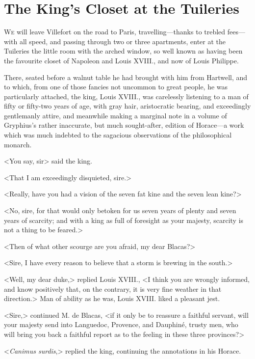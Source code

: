 \chapter{The King's Closet at the Tuileries} 

 \lettrine{W}{e} will leave Villefort on the road to Paris, travelling—thanks to trebled fees—with all speed, and passing through two or three apartments, enter at the Tuileries the little room with the arched window, so well known as having been the favourite closet of Napoleon and Louis XVIII., and now of Louis Philippe. 

 There, seated before a walnut table he had brought with him from Hartwell, and to which, from one of those fancies not uncommon to great people, he was particularly attached, the king, Louis XVIII., was carelessly listening to a man of fifty or fifty-two years of age, with gray hair, aristocratic bearing, and exceedingly gentlemanly attire, and meanwhile making a marginal note in a volume of Gryphius's rather inaccurate, but much sought-after, edition of Horace—a work which was much indebted to the sagacious observations of the philosophical monarch. 

 <You say, sir\longdash> said the king. 

 <That I am exceedingly disquieted, sire.> 

 <Really, have you had a vision of the seven fat kine and the seven lean kine?> 

 <No, sire, for that would only betoken for us seven years of plenty and seven years of scarcity; and with a king as full of foresight as your majesty, scarcity is not a thing to be feared.> 

 <Then of what other scourge are you afraid, my dear Blacas?> 

 <Sire, I have every reason to believe that a storm is brewing in the south.> 

 <Well, my dear duke,> replied Louis XVIII., <I think you are wrongly informed, and know positively that, on the contrary, it is very fine weather in that direction.> Man of ability as he was, Louis XVIII. liked a pleasant jest. 

 <Sire,> continued M. de Blacas, <if it only be to reassure a faithful servant, will your majesty send into Languedoc, Provence, and Dauphiné, trusty men, who will bring you back a faithful report as to the feeling in these three provinces?> 

 <\textit{Canimus surdis},> replied the king, continuing the annotations in his Horace. 

